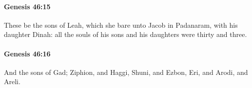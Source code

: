		\paragraph{Genesis 46:15} %
			\label{GENESIS-46-15}

			These be the sons of Leah, which she bare unto Jacob in Padanaram, with his daughter Dinah: all the souls of his sons and his daughters were thirty and three.


		\paragraph{Genesis 46:16} %
			\label{GENESIS-46-16}

			And the sons of Gad; Ziphion, and Haggi, Shuni, and Ezbon, Eri, and Arodi, and Areli.


